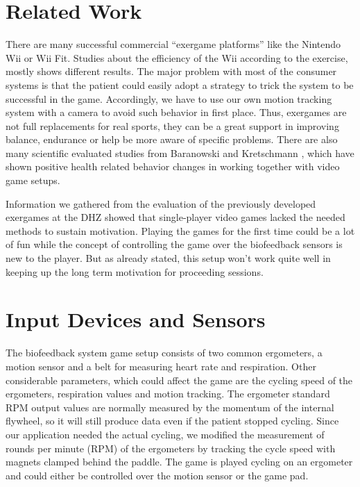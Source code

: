 \begin{multicols}{2}
\section{Related Work}
There are many successful commercial “exergame platforms” like the Nintendo Wii or Wii Fit. Studies about the efficiency of the Wii according to the exercise, mostly shows different results. \cite{Baranowski2012} The major problem with most of the consumer systems is that the patient could easily adopt a strategy to trick the system to be successful in the game. Accordingly, we have to use our own motion tracking system with a camera to avoid such behavior in first place. Thus, exergames are not full replacements for real sports, they can be a great support in improving balance, endurance or help be more aware of specific problems. There are also many scientific evaluated studies from Baranowski \cite{Baranowski2008} and Kretschmann \cite{Kretschmann2010}, which have shown positive health related behavior changes in working together with video game setups.

Information we gathered from the evaluation of the previously developed exergames at the DHZ showed that single-player video games lacked the needed methods to sustain motivation. Playing the games for the first time could be a lot of fun while the concept of controlling the game over the biofeedback sensors is new to the player. But as already stated, this setup won't work quite well in keeping up the long term motivation for proceeding sessions.



\section{Input Devices and Sensors}
The biofeedback system game setup consists of two common ergometers, a motion sensor and a belt for measuring heart rate and respiration. 
Other considerable parameters, which could affect the game are the cycling speed of the ergometers, respiration values and motion tracking. The ergometer standard RPM output values are normally measured by the momentum of the internal flywheel, so it will still produce data even if the patient stopped cycling. Since our application needed the actual cycling, we modified the measurement of rounds per minute (RPM) of the ergometers by tracking the cycle speed with magnets clamped behind the paddle. The game is played cycling on an ergometer and could either be controlled over the motion sensor or the game pad.


\end{multicols}
